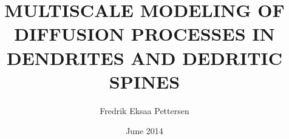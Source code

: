 \documentclass[twoside,english]{uiofysmaster}
\author{Fredrik Eksaa Pettersen}
\title{\uppercase{Multiscale modeling of diffusion processes in dendrites and dedritic spines}}
\date{June 2014}
\begin{document}
\begin{titlepage}
\maketitle
\end{titlepage}
\end{document}
